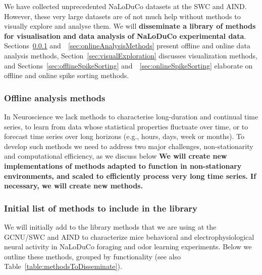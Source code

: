 We have collected unprecedented NaLoDuCo datasets at the SWC and AIND. However,
these very large datasets are of not much help without methods to visually
explore and analyse them. We will \textbf{disseminate a library of methods for
visualisation and data analysis of NaLoDuCo experimental data}.
%
Sections~\ref{sec:offlineAnalysisMethods}
and~~\ref{sec:onlineAnalysisMethods} present offline and online data analysis
methods,
%
Section~\ref{sec:visualExploration}
discusses visualization methods,
%
and Sections~\ref{sec:offlineSpikeSorting}
and~~\ref{sec:onlineSpikeSorting} elaborate on offline and online spike sorting
methods.

\subsubsection{Offline analysis methods}
\label{sec:offlineAnalysisMethods}

In Neuroscience we lack methods to characterise long-duration and continual
time series, to learn from data whose statistical properties fluctuate over
time, or to forecast time series over long horizons (e.g., hours, days, week or
months). To develop such methods we need to address two major challenges,
non-stationarity and computational efficiency, as we discuss below
\textbf{We will create new implementations of methods adapted to function in
non-stationary environments, and scaled to efficiently process very long time
series. If necessary, we will create new methods.}

\subsubsection*{Initial list of methods to include in the library}
\label{sec:initialListOfMethods}

We will initially add to the library methods that we are using at the GCNU/SWC
and AIND to characterize mice behavioral and electrophysiological neural
activity in NaLoDuCo foraging and odor learning experiments.
%
Below we outline these methods, grouped by functionality (see also
Table~\ref{table:methodsToDisseminate}).


